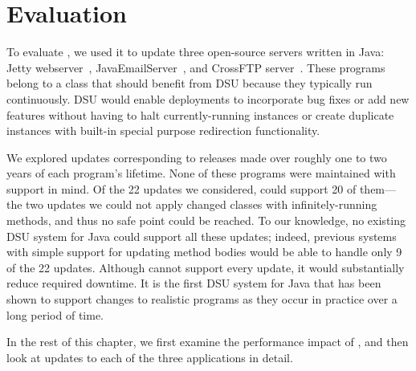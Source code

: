 \chapter{Evaluation}
\label{chap:experience}

To evaluate \JV, we used it to update three open-source servers written in
Java: Jetty webserver~\cite{jetty}, JavaEmailServer~\cite{jes}, %
and CrossFTP server~\cite{crossftp}. These programs
belong to a class that should benefit from DSU because they typically run
continuously.  DSU would enable deployments to incorporate bug fixes or add
new features without having to halt currently-running instances or create
duplicate instances with built-in special purpose redirection
functionality.

We explored updates corresponding to releases made over roughly one to two
years of each program's lifetime.  None of these programs were maintained
with \USD support in mind. Of the 22 updates we considered, \JV could
support 20 of them---the two updates we could not apply changed classes
with infinitely-running methods, and thus no safe point could be reached.
To our knowledge, no existing DSU system for Java could support all these
updates; indeed, previous systems with simple support for updating method
bodies would be able to handle only 9 of the 22 updates.  Although \JV
cannot support every update, it would substantially reduce required
downtime. It is the first DSU system for Java that has been shown to
support changes to realistic programs as they occur in practice over a long
period of time.

In the rest of this chapter, we first examine the performance impact of
\JV, and then look at updates to each of the three applications in detail.

